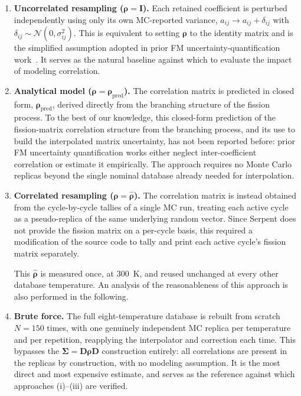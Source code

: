 \documentclass{style/nseJournal}
\begin{document}
\begin{enumerate}
      \item[(i)] \textbf{Uncorrelated resampling ($\boldsymbol\rho=\mathbf{I}$).} Each retained coefficient is perturbed independently using only its own MC-reported variance, $a_{ij}\to a_{ij}+\delta_{ij}$ with $\delta_{ij}\sim\mathcal{N}(0,\sigma_{ij}^2)$. This is equivalent to setting $\boldsymbol\rho$ to the identity matrix and is the simplified assumption adopted in prior FM uncertainty-quantification work~\cite{HeWaltersNSE2022}. It serves as the natural baseline against which to evaluate the impact of modeling correlation.

    \item[(ii)] \textbf{Analytical model ($\boldsymbol\rho=\boldsymbol\rho_{\text{pred}}$).} The correlation matrix is predicted in closed form, $\boldsymbol\rho_{\text{pred}}$, derived directly from the branching structure of the fission process. To the best of our knowledge, this closed-form prediction of the fission-matrix correlation structure from the branching process, and its use to build the interpolated matrix uncertainty, has not been reported before: prior FM uncertainty quantification works either neglect inter-coefficient correlation or estimate it empirically. The approach requires no Monte Carlo replicas beyond the single nominal database already needed for interpolation.

    \item[(iii)] \textbf{Correlated resampling ($\boldsymbol\rho=\hat{\boldsymbol\rho}$).} The correlation matrix is instead obtained from the cycle-by-cycle tallies of a single MC run, treating each active cycle as a pseudo-replica of the same underlying random vector. Since Serpent does not provide the fission matrix on a per-cycle basis, this required a modification of the source code to tally and print each active cycle's fission matrix separately.

  This $\hat{\boldsymbol\rho}$ is measured once, at 300~K, and reused unchanged at every other database temperature. An analysis of the reasonableness of this approach is also performed in the following.

  \item[(iv)] \textbf{Brute force.} The full eight-temperature database is rebuilt from scratch $N=150$ times, with one genuinely independent MC replica per temperature and per repetition, reapplying the interpolator and correction each time. This bypasses the $\boldsymbol\Sigma=\mathbf{D}\boldsymbol\rho\mathbf{D}$ construction entirely: all correlations are present in the replicas by construction, with no modeling assumption. It is the most direct and most expensive estimate, and serves as the reference against which approaches (i)--(iii) are verified.
\end{enumerate}
\end{document}
